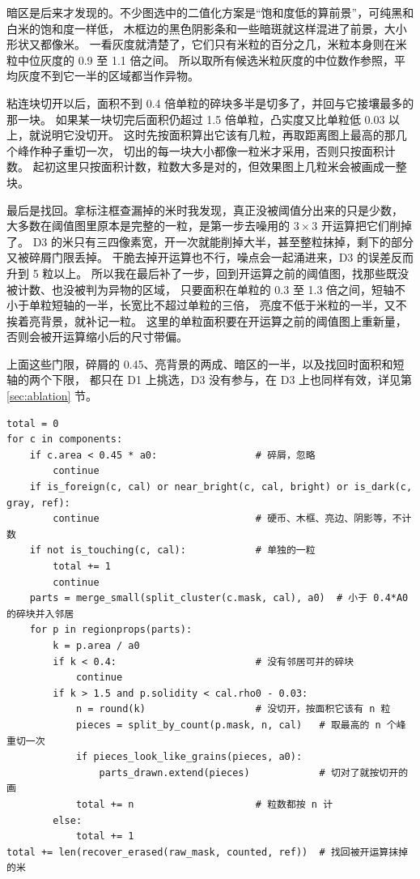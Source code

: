 暗区是后来才发现的。不少图选中的二值化方案是“饱和度低的算前景”，可纯黑和白米的饱和度一样低，
木框边的黑色阴影条和一些暗斑就这样混进了前景，大小形状又都像米。
一看灰度就清楚了，它们只有米粒的百分之几，米粒本身则在米粒中位灰度的 0.9 至 1.1 倍之间。
所以取所有候选米粒灰度的中位数作参照，平均灰度不到它一半的区域都当作异物。

粘连块切开以后，面积不到 0.4 倍单粒的碎块多半是切多了，并回与它接壤最多的那一块。
如果某一块切完后面积仍超过 1.5 倍单粒，凸实度又比单粒低 0.03 以上，就说明它没切开。
这时先按面积算出它该有几粒，再取距离图上最高的那几个峰作种子重切一次，
切出的每一块大小都像一粒米才采用，否则只按面积计数。
起初这里只按面积计数，粒数大多是对的，但效果图上几粒米会被画成一整块。

最后是找回。拿标注框查漏掉的米时我发现，真正没被阈值分出来的只是少数，
大多数在阈值图里原本是完整的一粒，是第一步去噪用的 $3\times3$ 开运算把它们削掉了。
D3 的米只有三四像素宽，开一次就能削掉大半，甚至整粒抹掉，剩下的部分又被碎屑门限丢掉。
干脆去掉开运算也不行，噪点会一起涌进来，D3 的误差反而升到 5 粒以上。
所以我在最后补了一步，回到开运算之前的阈值图，找那些既没被计数、也没被判为异物的区域，
只要面积在单粒的 0.3 至 1.3 倍之间，短轴不小于单粒短轴的一半，长宽比不超过单粒的三倍，
亮度不低于米粒的一半，又不挨着亮背景，就补记一粒。
这里的单粒面积要在开运算之前的阈值图上重新量，否则会被开运算缩小后的尺寸带偏。

上面这些门限，碎屑的 0.45、亮背景的两成、暗区的一半，以及找回时面积和短轴的两个下限，
都只在 D1 上挑选，D3 没有参与，在 D3 上也同样有效，详见第 \ref{sec:ablation} 节。

\begin{lstlisting}[float=!htbp, caption={计数主循环}, label={code:count}]
total = 0
for c in components:
    if c.area < 0.45 * a0:                 # 碎屑，忽略
        continue
    if is_foreign(c, cal) or near_bright(c, cal, bright) or is_dark(c, gray, ref):
        continue                           # 硬币、木框、亮边、阴影等，不计数
    if not is_touching(c, cal):            # 单独的一粒
        total += 1
        continue
    parts = merge_small(split_cluster(c.mask, cal), a0)  # 小于 0.4*A0 的碎块并入邻居
    for p in regionprops(parts):
        k = p.area / a0
        if k < 0.4:                        # 没有邻居可并的碎块
            continue
        if k > 1.5 and p.solidity < cal.rho0 - 0.03:
            n = round(k)                   # 没切开，按面积它该有 n 粒
            pieces = split_by_count(p.mask, n, cal)   # 取最高的 n 个峰重切一次
            if pieces_look_like_grains(pieces, a0):
                parts_drawn.extend(pieces)            # 切对了就按切开的画
            total += n                     # 粒数都按 n 计
        else:
            total += 1
total += len(recover_erased(raw_mask, counted, ref))  # 找回被开运算抹掉的米
\end{lstlisting}

